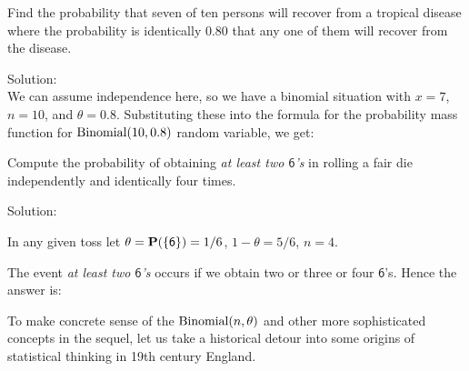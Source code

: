 \begin{example}\label{Eg:70f10recover}
Find the probability that seven of ten persons will recover from a
  tropical disease where the probability is
  identically $0.80$ that any one of them will recover from the
  disease.

{Solution:}\\[4pt]
We can assume independence here, so we have a binomial
situation with  $x=7$, $n=10$, and $\theta=0.8$. Substituting these into the formula for the probability mass function for $\mbox{{\rm Binomial}}(10,0.8)$ random variable, we get:
\end{example}

\begin{example}\label{Eg:alteast2_6s}
{Compute the probability of obtaining {\em at least two
    $\mathsf{6}$'s} in rolling a fair die independently and identically
  four times.}

{Solution:}\\[4pt]
{In any given toss let $\theta=\mathbf{P}(\{\mathsf{6}\})=1/6$,
$1-\theta=5/6$, $n=4$.

The event {\em at least two $\mathsf{6}$'s} occurs if we obtain two or
three or four $\mathsf{6}$'s.  Hence the answer is:
}
\end{example}

To make concrete sense of the $\mbox{{\rm Binomial}}(n,\theta)$ and other more sophisticated concepts in the sequel, let us take a historical detour into some origins of statistical thinking in 19th century England.

